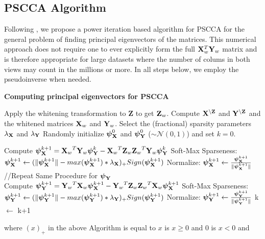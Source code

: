 \documentclass{llncs}
\newcommand{\X}{{\bf X}}
\newcommand{\Y}{{\bf Y}}
\newcommand{\Z}{{\bf Z}}
\newcommand{\bs}{\boldsymbol}
\begin{document}

\subsection{PSCCA Algorithm}
Following \cite{golub}, we propose a power iteration based algorithm
for PSCCA for the general problem of finding principal eigenvectors of
the matrices.  This numerical approach does not require one to ever
explicitly form the full $\X_{w}^T \Y_{w}$ matrix and is therefore
appropriate for large datasets where the number of colums in both views may
count in the millions or more.  In all steps below, we employ the
pseudoinverse when needed.  

\begin{algorithm}[htdp]
\small \caption{\bf Computing principal eigenvectors for PSCCA}
\label{partial-mic}
\begin{algorithmic}[1]
\STATE Apply the whitening transformation to {\Z} to get $\Z_{w}$.
\STATE Compute $\X^{\backslash \Z}$ and $\Y^{\backslash \Z}$ and the whitened matrices $\X_{w}$ and $\Y_{w}$. 
\STATE Select the (fractional) sparsity parameters $\lambda_{\X}$ and $\lambda_{\Y}$
\STATE Randomly initialize $\bs \psi_{\X}^0$ and $\bs \psi_{\Y}^0$ ($\sim \mathcal{N}(0,1)$) and set $k=0$.

\WHILE {$\Delta$ Corr($\bs X_w \bs \psi_{\X}^{k+1}$, $\bs Y_w \bs \psi_{\Y}^{k+1}$) $<$ $\epsilon$}
\STATE Compute  $\bs \psi_{\X}^{k+1}= {\X_w}^T {\Y_w} \bs \psi_{\Y}^{k} -  {\X_w}^T  {\Z_w} {\Z_w}^T {\Y_w} \bs \psi_{\Y}^{k}$
\STATE Soft-Max Sparseness:  $\bs \psi_{\X}^{k+1} \leftarrow (\|\bs \psi_{\X}^{k+1}\|  - max(\bs \psi_{\X}^{k+1})*\lambda_{\X})_+ Sign(\bs \psi_{\X}^{k+1})$
\STATE Normalize: $\bs \psi_{\X}^{k+1} \leftarrow \frac{\bs \psi_{\X}^{k+1}}{\|\bs \psi_{\X}^{k+1}\|}$\\
//Repeat Same Procedure for $\bs \psi_{\Y}$ \\
\STATE Compute  $\bs \psi_{\Y}^{k+1}= {\Y_w}^T {\X_w} \bs \psi_{\X}^{k+1} -  {\Y_w}^T  {\Z_w} {\Z_w}^T {\X_w} \bs \psi_{\X}^{k+1}$
\STATE Soft-Max Sparseness: $\bs \psi_{\Y}^{k+1} \leftarrow (\|\bs \psi_{\Y}^{k+1}\|  - max(\bs \psi_{\Y}^{k+1})*\lambda_{\Y})_+ Sign(\bs \psi_{\Y}^{k+1})$
\STATE Normalize: $\bs \psi_{\Y}^{k+1} \leftarrow \frac{\bs \psi_{\Y}^{k+1}}{\|\bs \psi_{\Y}^{k+1}\|}$
\STATE k $\leftarrow$ k+1
\ENDWHILE
\end{algorithmic}
\end{algorithm}
where $(x)_+$ in the above Algorithm is equal to $x$ is $x \geq 0$ and $0$ is $x <0$ and 
\end{document}
